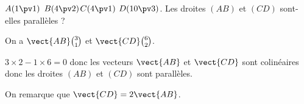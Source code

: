 \documentclass[10pt,openright,twoside,french]{book}
\begin{document}
\begin{Exemple}
    $A(1 \pv 1)$ \quad $B(4\pv 2)$\quad $C(4 \pv 1)$ \quad $D(10\pv 3)$. Les droites $(AB)$ et $(CD)$ sont-elles parallèles ?\par\medskip
    On a $\vect{AB}\binom 3 1$ et $\vect{CD}\binom 6 2$.\par\medskip
     $3 \times 2 - 1 \times 6 = 0$ donc les vecteurs $\vect{AB}$ et $\vect{CD}$ sont colinéaires donc les droites $(AB)$ et $(CD)$ sont parallèles.\par\medskip
    On remarque que $\vect{CD}= 2\vect{AB}$.
\end{Exemple}
\end{document}
